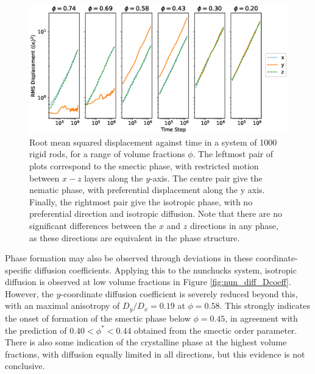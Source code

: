 \documentclass[11pt, a4paper]{article} %
\begin{document}
\begin{figure} [h!]
	\centering
	\includegraphics[width=\linewidth]{Figures/nun_diff_rmsplots}
	\caption{Root mean squared displacement against time in a system of 1000 rigid rods, for a range of volume fractions $\phi$. The leftmost pair of plots correspond to the smectic phase, with restricted motion between $x-z$ layers along the $y$-axis. The centre pair give the nematic phase, with preferential displacement along the y axis. Finally, the rightmost pair give the isotropic phase, with no preferential direction and isotropic diffusion. Note that there are no significant differences between the $x$ and $z$ directions in any phase, as these directions are equivalent in the phase structure.}
	\label{fig:nun_diff_rmsplots}
\end{figure}  %

Phase formation may also be observed through deviations in these coordinate-specific diffusion coefficients. Applying this to the nunchucks system, isotropic diffusion is observed at low volume fractions in Figure \ref{fig:nun_diff_Dcoeff}. However, the $y$-coordinate diffusion coefficient is severely reduced beyond this, with an maximal anisotropy of $D_{y}/D_{x} = 0.19$ at $\phi = 0.58$. This strongly indicates the onset of formation of the smectic phase below $\phi = 0.45$, in agreement with the prediction of $ 0.40<\phi^{*}<0.44$ obtained from the smectic order parameter. There is also some indication of the crystalline phase at the highest volume fractions, with diffusion equally limited in all directions, but this evidence is not conclusive.
\end{document}
